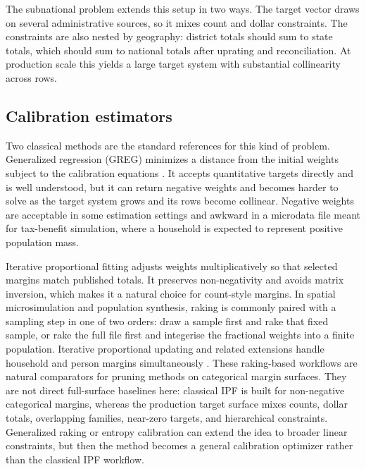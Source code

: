The subnational problem extends this setup in two ways. The target vector draws on several
administrative sources, so it mixes count and dollar constraints. The constraints are also nested by
geography: district totals should sum to state totals, which should sum to national totals after
uprating and reconciliation. At production scale this yields a large target system with substantial
collinearity across rows.

\subsection{Calibration estimators}

Two classical methods are the standard references for this kind of problem. Generalized regression
(GREG) minimizes a distance from the initial weights subject to the calibration equations
\citep{deville1992, sarndal2007}. It accepts quantitative targets directly and is well understood,
but it can return negative weights and becomes harder to solve as the target system grows and its
rows become collinear. Negative weights are acceptable in some estimation settings and awkward in a
microdata file meant for tax-benefit simulation, where a household is expected to represent positive
population mass.

Iterative proportional fitting \citep[IPF, or raking;][]{deming1940, ireland1968} adjusts weights
multiplicatively so that selected margins match published totals. It preserves non-negativity and
avoids matrix inversion, which makes it a natural choice for count-style margins. In spatial
microsimulation and population synthesis, raking is commonly paired with a sampling step in one of two
orders: draw a sample first and rake that fixed sample, or rake the full file first and integerise the
fractional weights into a finite population. Iterative proportional updating and related extensions
handle household and person margins simultaneously \citep{pritchard2012}. These raking-based workflows
are natural comparators for pruning methods on categorical margin surfaces. They are not direct
full-surface baselines here: classical IPF is built for non-negative categorical margins, whereas the
production target surface mixes counts, dollar totals, overlapping families, near-zero targets, and
hierarchical constraints. Generalized raking or entropy calibration can extend the idea to broader
linear constraints, but then the method becomes a general calibration optimizer rather than the
classical IPF workflow.

